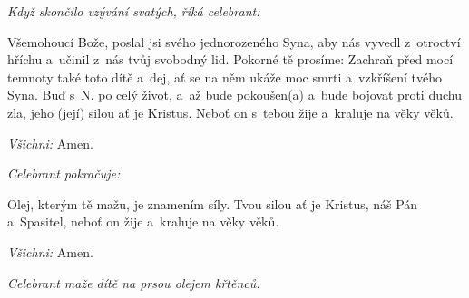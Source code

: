 \textit{Když skončilo vzývání svatých, říká celebrant:}

Všemohoucí Bože, poslal jsi svého jednorozeného Syna,
aby nás vyvedl z~otroctví hříchu
a~učinil z~nás tvůj svobodný lid.
Pokorné tě prosíme:
Zachraň před mocí temnoty také toto dítě
a~dej, ať se na něm ukáže moc smrti a~vzkříšení tvého Syna.
Buď s~{\color{red}N.} po celý život,
a~až bude pokoušen(a) a~bude bojovat proti duchu zla,
jeho (její) silou ať je Kristus.
Neboť on s~tebou žije a~kraluje na věky věků.

\textit{Všichni:} Amen.

\textit{Celebrant pokračuje:}

Olej, kterým tě mažu, je znamením síly.
Tvou silou ať je Kristus, náš Pán a~Spasitel, neboť on žije a~kraluje na věky věků.

\textit{Všichni:} Amen.

\textit{Celebrant maže dítě na prsou olejem křtěnců.}
